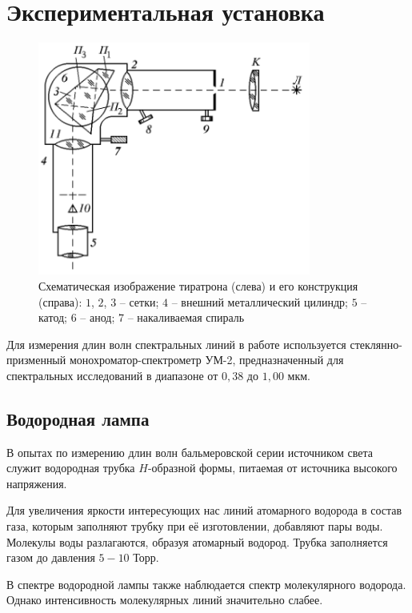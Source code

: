 \documentclass[a4paper,12pt]{article}
\begin{document}
\section{Экспериментальная установка}
\begin{figure}\label{fig: Exp setup}
    \begin{center}
    \vspace{-20pt}
        \includegraphics[width = 0.8\textwidth]{Exp setup.png}
    \end{center}
    \caption{Схематическая изображение тиратрона (слева) и его конструкция (справа): $1$, $2$, $3$ -- сетки; $4$ -- внешний металлический цилиндр; $5$ -- катод; $6$ -- анод; $7$ -- накаливаемая спираль}
\end{figure}
Для измерения длин волн спектральных линий в работе используется стеклянно-призменный монохроматор-спектрометр УМ-2, предназначенный для спектральных исследований в диапазоне от $0,38$ до $1,00$ мкм.

\subsection{Водородная лампа}
В опытах по измерению длин волн бальмеровской серии источником света служит водородная трубка $H$-образной формы, питаемая от источника высокого напряжения. 

Для увеличения яркости интересующих нас линий атомарного водорода в состав газа, которым заполняют трубку при её  изготовлении, добавляют пары воды. Молекулы воды разлагаются, образуя атомарный водород. Трубка заполняется газом до давления $5-10$ Торр.

В спектре водородной лампы также наблюдается спектр молекулярного водорода. Однако интенсивность молекулярных линий значительно слабее. 
\end{document}
